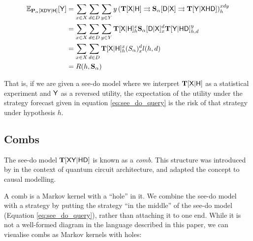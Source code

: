\begin{align}
    \mathbb{E}_{\mathbf{P}_{\alpha}[\mathsf{X}\mathsf{D}\mathsf{Y}|\mathsf{H}]}[\mathsf{Y}] &= \sum_{x\in X} \sum_{d\in D} \sum_{y\in Y} y \left(\mathbf{T}[\mathsf{X}|\mathsf{H}]\rightrightarrows \mathbf{S}_\alpha [\mathsf{D}|\mathsf{X}] \rightrightarrows \mathbf{T}[\mathsf{Y}|\mathsf{XHD}]\right)_h^{xdy}\\
     &= \sum_{x\in X} \sum_{d\in D} \sum_{y\in Y} \mathbf{T}[\mathsf{X}|\mathsf{H}]^x_h \mathbf{S}_\alpha [\mathsf{D}|\mathsf{X}]_x^d \mathbf{T}[\mathsf{Y}|\mathsf{H}\mathsf{D}]_{h,d}^y\\
    &= \sum_{x\in X}\sum_{d\in D} \mathbf{T}[\mathsf{X}|\mathsf{H}]_h^x (S_\alpha)_x^d l(h,d)\\
    &= R(h,\mathbf{S}_\alpha)
\end{align}

That is, if we are given a see-do model where we interpret $\mathbf{T}[\mathsf{X}|\mathsf{H}]$ as a statistical experiment and $\mathsf{Y}$ as a reversed utility, the expectation of the utility under the strategy forecast given in equation \ref{eq:see_do_query} is the risk of that strategy under hypothesis $h$.

\subsection{Combs}

The see-do model $\mathbf{T}[\mathsf{X}\mathsf{Y}|\mathsf{HD}]$ is known as a \emph{comb}. This structure was introduced by \citet{chiribella_quantum_2008} in the context of quantum circuit architecture, and \citet{jacobs_causal_2019} adapted the concept to causal modelling.

A comb is a Markov kernel with a ``hole'' in it. We combine the see-do model with a strategy by putting the strategy ``in the middle'' of the see-do model (Equation \ref{eq:see_do_query}), rather than attaching it to one end. While it is not a well-formed diagram in the language described in this paper, we can visualise combs as Markov kernels with holes:

